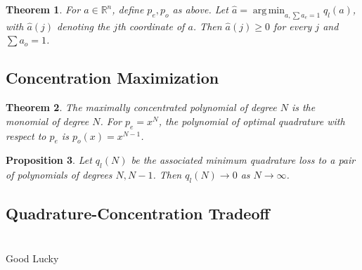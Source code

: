 \documentclass[final,3p]{CSP}
\DeclareMathOperator*{\argmin}{arg\,min}
\newtheorem{thm}{Theorem}[section]
\newtheorem{prop}[thm]{Proposition}
\theoremstyle{definition}
\theoremstyle{remark}
\numberwithin{equation}{section}
\begin{document}
\begin{thm}
For $a\in\mathbb{R}^n$, define $p_e, p_o$ as above. Let $\hat{a} = \argmin_{a, \sum a_e = 1} q_l(a)$, with $\hat{a}(j)$ denoting the $j$th coordinate of $a$. Then $\hat{a}(j) \ge 0$ for every $j$ and $\sum a_o = 1$.
\end{thm}
\subsection{Concentration Maximization}
\begin{thm}The maximally concentrated polynomial of degree $N$ is the monomial of degree $N$. For $p_e = x^N$, the polynomial of optimal quadrature with respect to $p_e$ is $p_o(x) = x^{N-1}$. \end{thm}

\begin{prop} Let $q_l(N)$ be the associated minimum quadrature loss to a pair of polynomials of degrees $N, N-1$. Then $q_l(N) \to 0$ as $N\to \infty$. 
\end{prop}
\subsection{Quadrature-Concentration Tradeoff}
\it



 \appendix

 \section{}
 \label{}
Good Lucky
\end{document}
